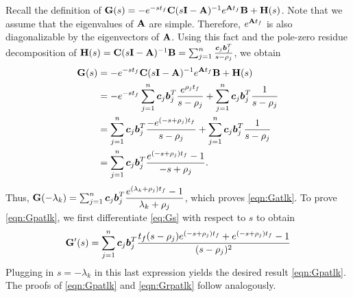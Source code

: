 \documentclass[twocolumn]{autart}
\begin{document}
\begin{pf}
Recall the definition of $\mathbf{G}(s) = -e^{-st_f}\mathbf{C}(s\mathbf{I}-\mathbf{A})^{-1}e^{\mathbf{A} t_f}\mathbf{B}+\mathbf{H}(s)$. Note that we assume that the eigenvalues of $\mathbf{A}$ are simple. Therefore, $e^{\mathbf{A} t_f}$ is also diagonalizable by the eigenvectors of $\mathbf{A}$. Using this fact and the pole-zero residue decomposition of   $\mathbf{H}(s) = \mathbf{C}(s\mathbf{I}-\mathbf{A})^{-1} \mathbf{B} = \sum_{j=1}^n \frac{\boldsymbol{c}_j \boldsymbol{b}_j^T}{s-\rho_j}$, we obtain 
\begin{align}
\mathbf{G}(s) &= -e^{-st_f}\mathbf{C}(s\mathbf{I}-\mathbf{A})^{-1}e^{\mathbf{A} t_f}\mathbf{B}+\mathbf{H}(s)  \nonumber \\ 
&=-e^{-s{t_f}}\sum_{j=1}^n\boldsymbol{c}_j\boldsymbol{b}_j^T\dfrac{e^{\rho_jt_f}}{s-\rho_j}+\sum_{j=1}^n\boldsymbol{c}_j\boldsymbol{b}_j^T\dfrac{1}{s-\rho_j}\\
&=\sum_{j=1}^n\boldsymbol{c}_j\boldsymbol{b}_j^T\dfrac{-e^{(-s + \rho_j){t_f}}}{s-\rho_j}+\sum_{j=1}^n\boldsymbol{c}_j\boldsymbol{b}_j^T\dfrac{1}{s-\rho_j} \nonumber\\
&=\sum_{j=1}^n\boldsymbol{c}_j\boldsymbol{b}_j^T\dfrac{e^{(-s+\rho_j)t_f}-1}{-s+\rho_j}. \label{eq:Gs}
\end{align}
Thus,
$\mathbf{G}(-\lambda_k)=\sum_{j=1}^n\boldsymbol{c}_j\boldsymbol{b}_j^T\dfrac{e^{(\lambda_k+\rho_j){t_f}}-1}{\lambda_k+\rho_j}$,
which proves \eqref{eqn:Gatlk}. To prove \eqref{eqn:Gpatlk}, we first differentiate \eqref{eq:Gs} with respect to $s$ to obtain
 \begin{align*}
 \mathbf{G}'(s) =\sum_{j=1}^n\boldsymbol{c}_j\boldsymbol{b}_j^T\dfrac {{t_f} (s-\rho_j)e^{(-s+\rho_j){t_f}}+e^{(-s+\rho_j){t_f}}-1}{(s-\rho_j)^2}
 \end{align*}
 Plugging in $s= -\lambda_k$ in this last expression yields the desired result \eqref{eqn:Gpatlk}. The proofs of
 \eqref{eqn:Gpatlk} and \eqref{eqn:Grpatlk} follow analogously. 
\end{pf}%
\end{document}
